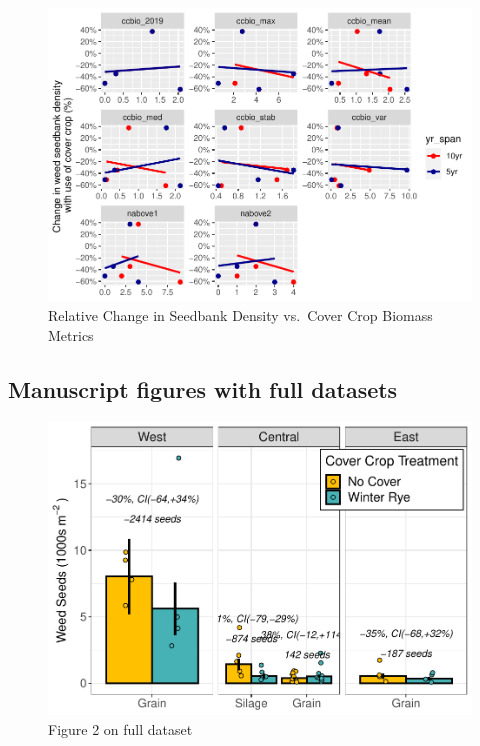 \documentclass[]{article}
\begin{document}
\begin{figure}
\centering
\includegraphics{supp-mat_files/figure-latex/unnamed-chunk-9-1.pdf}
\caption{Relative Change in Seedbank Density vs.~Cover Crop Biomass
Metrics}
\end{figure}

\newpage

\hypertarget{manuscript-figures-with-full-datasets}{%
\subsection{Manuscript figures with full
datasets}\label{manuscript-figures-with-full-datasets}}

\begin{figure}
\centering
\includegraphics{supp-mat_files/figure-latex/unnamed-chunk-10-1.pdf}
\caption{Figure 2 on full dataset}
\end{figure}
\end{document}
